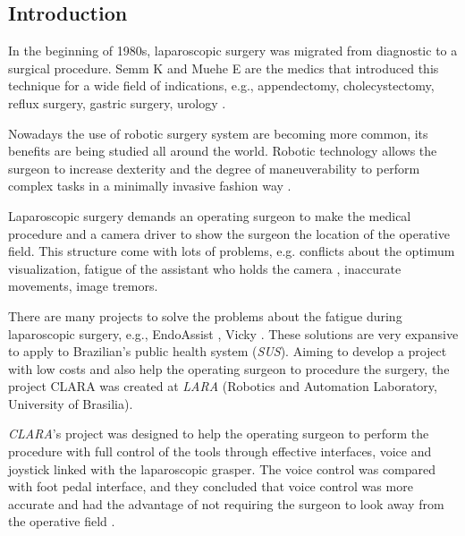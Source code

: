\documentclass{svproc}
\begin{document}
	\begin{multicols}{2}
		
	\section{Introduction}
	
	
	In the beginning of 1980s, laparoscopic surgery was migrated from diagnostic to a surgical procedure. Semm K and Muehe E are the medics that introduced this technique for a wide field of indications, e.g., appendectomy, cholecystectomy, reflux surgery, gastric surgery, urology \cite{pmid26713285}. 
	
	Nowadays the use of robotic surgery system are becoming more common, its benefits are being studied all around the world. Robotic technology allows the surgeon to increase dexterity and the degree of maneuverability to perform complex tasks in a minimally invasive fashion way \cite{doi:10.3109/10929088.2010.541620}. 
	
	
 	Laparoscopic surgery demands an operating surgeon to make the medical procedure and a camera driver to show the surgeon the location of the operative field. This structure come with lots of problems, e.g. conflicts about the optimum visualization, fatigue of the assistant who holds the camera \cite{pmid28643066}, inaccurate movements, image tremors.
 	
 	There are many projects to solve the problems about the fatigue during laparoscopic surgery, e.g., EndoAssist \cite{pmid25484949}, Vicky \cite{pmid17867952}. These solutions are very expansive to apply to Brazilian's public health system (\textit{SUS}). Aiming to develop a project with low costs and also help the operating surgeon to procedure the surgery, the project CLARA was created at \textit{LARA} (Robotics and Automation Laboratory, University of Brasilia).
 	
 	
 	\textit{CLARA}'s project was designed to help the operating surgeon to perform the procedure with full control of the tools through effective interfaces, voice and joystick linked with the laparoscopic grasper. The voice control was compared with foot pedal interface, and they concluded that voice control was more accurate and had the advantage of not requiring the surgeon to look away from the operative field \cite{pmid16844449}. 
 	

\end{multicols}
\end{document}
